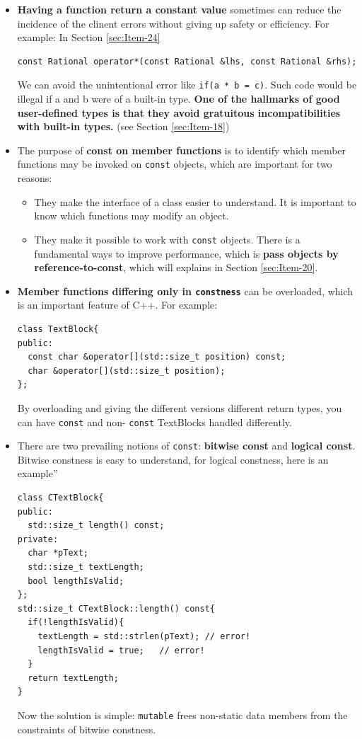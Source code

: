\documentclass[a4paper,twoside]{article}
\theoremstyle{definition}
\theoremstyle{remark}
\numberwithin{equation}{section}
\let\OldTexttt\texttt
\renewcommand{\texttt}[1]{{\color{blue} \OldTexttt{#1}}}
\begin{document}
\begin{itemize}
\item \textbf{Having a function return a constant value} sometimes can reduce
  the incidence of the clinent errors without giving up safety or
  efficiency. For example: In Section \ref{sec:Item-24}
\begin{verbatim}
const Rational operator*(const Rational &lhs, const Rational &rhs);
\end{verbatim}
  We can avoid the unintentional error like \texttt{if(a * b = c)}.
  Such code would be illegal if a and b were of a built-in
  type. \textbf{ One of the hallmarks of good user-defined types is
    that they avoid gratuitous incompatibilities with built-in types.}
  (see Section \ref{sec:Item-18})
\item The purpose of \textbf{const on member functions} is to identify
  which member functions may be invoked on \texttt{const} objects,
  which are important for two reasons:
  \begin{itemize}
  \item They make the interface of a class easier to understand. It is
    important to know which functions may modify an object.
  \item They make it possible to work with \texttt{const}
    objects. There is a fundamental ways to improve performance, which
    is \textbf{pass objects by reference-to-const}, which will
    explains in Section \ref{sec:Item-20}.
  \end{itemize}
\item \textbf{Member functions differing only in \texttt{constness}}
  can be overloaded, which is an important feature of C++. For
  example:
\begin{verbatim}
class TextBlock{
public:
  const char &operator[](std::size_t position) const;
  char &operator[](std::size_t position);
};
\end{verbatim}
By overloading and giving the different versions different return
types, you can have \texttt{const} and non-\texttt{const} TextBlocks
handled differently.
\item There are two prevailing notions of \texttt{const}:
  \textbf{bitwise const} and \textbf{logical const}. Bitwise constness
  is easy to understand, for logical constness, here is an example''
\begin{verbatim}
class CTextBlock{
public:
  std::size_t length() const;
private:
  char *pText;
  std::size_t textLength;
  bool lengthIsValid;
};
std::size_t CTextBlock::length() const{
  if(!lengthIsValid){
    textLength = std::strlen(pText); // error!
    lengthIsValid = true;   // error!
  }
  return textLength;
}
\end{verbatim}
Now the solution is simple: \texttt{mutable} frees non-static data
members from the constraints of bitwise constness.


\end{itemize}
\end{document}
